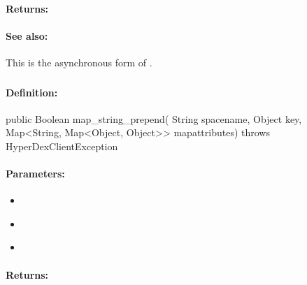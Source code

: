 \paragraph{Returns:}


\paragraph{See also:}  This is the asynchronous form of .

\pagebreak
\subsubsection{}
\label{api:java:map_string_prepend}


\paragraph{Definition:}
\begin{javacode}
public Boolean map_string_prepend(
        String spacename,
        Object key,
        Map<String, Map<Object, Object>> mapattributes) throws HyperDexClientException
\end{javacode}

\paragraph{Parameters:}
\begin{itemize}[noitemsep]
\item {}\\

\item {}\\

\item {}\\

\end{itemize}

\paragraph{Returns:}


